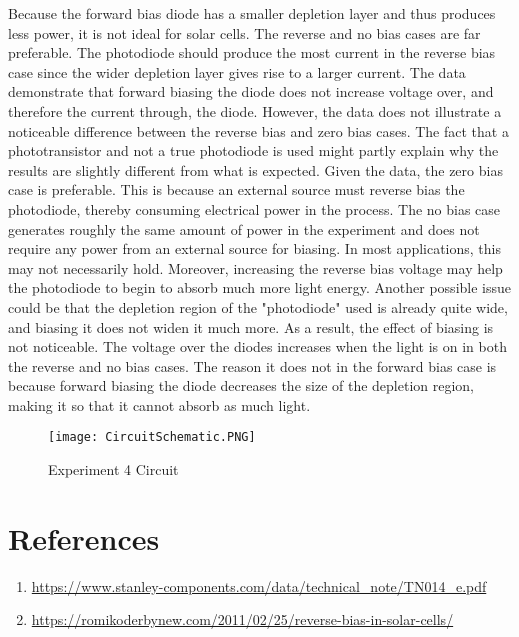 Because the forward bias diode has a smaller depletion layer and thus produces less power, it is not ideal for solar cells. The reverse and no bias cases are far preferable. The photodiode should produce the most current in the reverse bias case since the wider depletion layer gives rise to a larger current. The data demonstrate that forward biasing the diode does not increase voltage over, and therefore the current through, the diode. However, the data does not illustrate a noticeable difference between the reverse bias and zero bias cases. The fact that a phototransistor and not a true photodiode is used might partly explain why the results are slightly different from what is expected. Given the data, the zero bias case is preferable. This is because an external source must reverse bias the photodiode, thereby consuming electrical power in the process. The no bias case generates roughly the same amount of power in the experiment and does not require any power from an external source for biasing.
In most applications, this may not necessarily hold. Moreover, increasing the reverse bias voltage may help the photodiode to begin to absorb much more light energy. Another possible issue could be that the depletion region of the "photodiode" used is already quite wide, and biasing it does not widen it much more. As a result, the effect of biasing is not noticeable.
The voltage over the diodes increases when the light is on in both the reverse and no bias cases. The reason it does not in the forward bias case is because forward biasing the diode decreases the size of the depletion region, making it so that it cannot absorb as much light.

\begin{figure}[h!]
	\centering
	\texttt{[image: CircuitSchematic.PNG]}
	\caption{Experiment 4 Circuit}
	\label{fig:Circuit_Pic}
\end{figure}

\section{References}
\scriptsize{
	\begin{enumerate}
		\item \url{https://www.stanley-components.com/data/technical_note/TN014_e.pdf}
		\item \url{https://romikoderbynew.com/2011/02/25/reverse-bias-in-solar-cells/}
	\end{enumerate}
}

